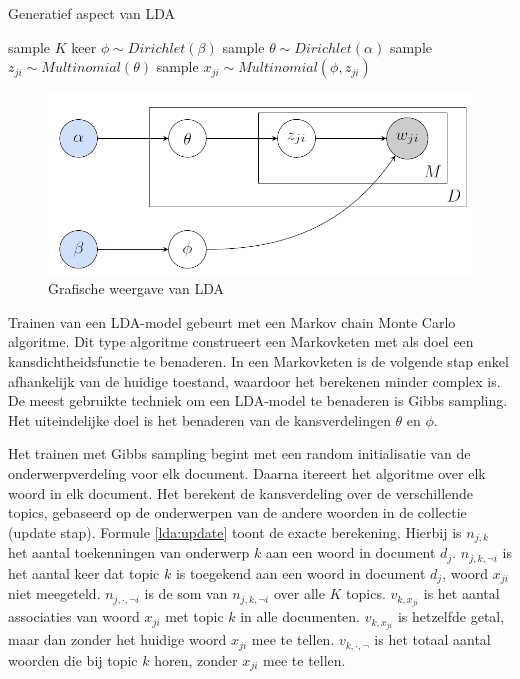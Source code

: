 \begin{algorithm}
\caption{Generatief aspect van LDA}
\begin{algorithmic} 
\STATE sample $K$ keer  $\phi \sim Dirichlet(\beta)$
\STATE sample $\theta \sim Dirichlet(\alpha)$
\STATE sample $z_{ji} \sim Multinomial(\theta)$
\STATE sample $x_{ji} \sim Multinomial(\phi,z_{ji})$
\ENDFOR
\ENDFOR
\end{algorithmic}
\label{algo:lda}
\end{algorithm}
                                  
\begin{figure}[tb]
    \centering
    \includegraphics[width=\linewidth]{Images/lda.png}
    \caption{Grafische weergave van LDA}
    \label{fig:lda}
\end{figure}

Trainen van een LDA-model gebeurt met een Markov chain Monte Carlo algoritme. Dit type algoritme construeert een Markovketen met als doel een kansdichtheidsfunctie te benaderen. In een Markovketen is de volgende stap enkel afhankelijk van de huidige toestand, waardoor het berekenen minder complex is. De meest gebruikte techniek om een LDA-model te benaderen is Gibbs sampling. Het uiteindelijke doel is het benaderen van de kansverdelingen $\theta$ en $\phi$.

Het trainen met Gibbs sampling begint met een random initialisatie van de onderwerpverdeling voor elk document. Daarna itereert het algoritme over elk woord in elk document. Het berekent de kansverdeling over de verschillende topics, gebaseerd op de onderwerpen van de andere woorden in de collectie (update stap). Formule \eqref{lda:update} toont de exacte berekening. Hierbij is $n_{j,k}$ het aantal toekenningen van onderwerp $k$ aan een woord in document $d_j$. $n_{j,k,\neg i}$ is het aantal keer dat topic $k$ is toegekend aan een woord in document $d_j$, woord $x_{ji}$ niet meegeteld. $n_{j,\cdot,\neg i}$ is de som van $n_{j,k,\neg i}$ over alle $K$ topics. $v_{k,x_{ji}}$ is het aantal associaties van woord $x_{ji}$ met topic $k$ in alle documenten. $v_{k,x_{ji}}$ is hetzelfde getal, maar dan zonder het huidige woord $x_{ji}$ mee te tellen. $v_{k,\cdot,\neg}$ is het totaal aantal woorden die bij topic $k$ horen, zonder $x_{ji}$ mee te tellen.

